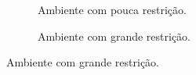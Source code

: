 \begin{figure}[h]
  \vspace{0.3cm}
  \begin{subfigure}[t]{0.45\textwidth}
    \centering
    \caption{Ambiente com pouca restrição.}
  \end{subfigure}
  \hspace{0.2cm}
  \begin{subfigure}[t]{0.45\textwidth}
    \centering
    \caption{Ambiente com grande restrição.}
  \end{subfigure}


\end{figure}
